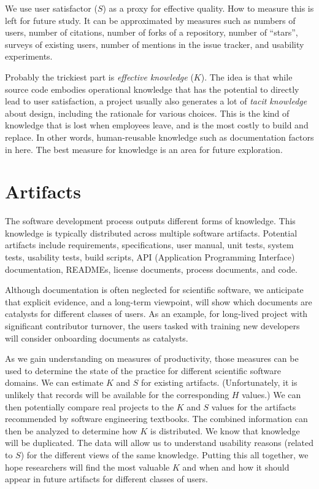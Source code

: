 \documentclass[sigconf, authorversion, nonacm]{acmart}
\begin{document}
We use user satisfactor ($S$) as a proxy for effective quality. How to 
measure this is left for future study. It can be approximated by measures
such as numbers of users, number of citations, number
of forks of a repository, number of ``stars'', surveys of existing users,
number of mentions in the issue tracker, and usability experiments.

Probably the trickiest part is \emph{effective knowledge} ($K$). The idea
is that while source code embodies operational knowledge that has the
potential to directly lead to user satisfaction, a project usually also
generates a lot of \emph{tacit knowledge} about design, including the
rationale for various choices. This is the kind of knowledge that is lost
when employees leave, and is the most costly to build and replace.
In other words, human-reusable knowledge such as documentation factors in
here.  The best measure for knowledge is an area for future exploration.

\section{Artifacts}

The software development process outputs different forms of knowledge. This
knowledge is typically distributed across multiple software artifacts.
Potential artifacts include requirements, specifications, user manual, unit
tests, system tests, usability tests, build scripts, API (Application
Programming Interface) documentation, READMEs, license documents, process
documents, and code.

Although documentation is often neglected for scientific software, we anticipate
that explicit evidence, and a long-term viewpoint, will show which documents are
catalysts for different classes of users.  As an example, for long-lived project
with significant contributor turnover, the users tasked with training new
developers will consider onboarding documents as catalysts.

As we gain understanding on measures of productivity, those measures can be used
to determine the state of the practice for different scientific software
domains. We can estimate $K$ and $S$ for existing artifacts. (Unfortunately, it
is unlikely that records will be available for the corresponding $H$ values.) We
can then potentially compare real projects to the $K$ and $S$ values for the
artifacts recommended by software engineering textbooks.  The combined
information can then be analyzed to determine how $K$ is distributed.  We know
that knowledge will be duplicated.  The data will allow us to understand
usability reasons (related to $S$) for the different views of the same
knowledge.  Putting this all together, we hope researchers will find the most
valuable $K$ and when and how it should appear in future artifacts for different
classes of users.
\end{document}

